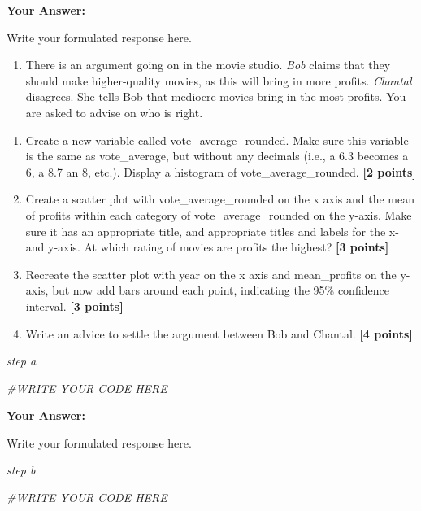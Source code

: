 \documentclass[
]{article}
\newenvironment{Shaded}{\begin{snugshade}}{\end{snugshade}}
\newcommand{\CommentTok}[1]{\textcolor[rgb]{0.56,0.35,0.01}{\textit{#1}}}
\providecommand{\tightlist}{%
  \setlength{\itemsep}{0pt}\setlength{\parskip}{0pt}}
\begin{document}
\textbf{Your Answer:}

Write your formulated response here.

\begin{enumerate}
\def\labelenumi{\arabic{enumi}.}
\setcounter{enumi}{2}
\tightlist
\item
  There is an argument going on in the movie studio. \emph{Bob} claims
  that they should make higher-quality movies, as this will bring in
  more profits. \emph{Chantal} disagrees. She tells Bob that mediocre
  movies bring in the most profits. You are asked to advise on who is
  right.
\end{enumerate}

\begin{enumerate}
\def\labelenumi{\alph{enumi}.}
\tightlist
\item
  Create a new variable called vote\_average\_rounded. Make sure this
  variable is the same as vote\_average, but without any decimals (i.e.,
  a 6.3 becomes a 6, a 8.7 an 8, etc.). Display a histogram of
  vote\_average\_rounded. \textbf{[2 points]}
\item
  Create a scatter plot with vote\_average\_rounded on the x axis and
  the mean of profits within each category of vote\_average\_rounded on
  the y-axis. Make sure it has an appropriate title, and appropriate
  titles and labels for the x- and y-axis. At which rating of movies are
  profits the highest? \textbf{[3 points]}
\item
  Recreate the scatter plot with year on the x axis and mean\_profits on
  the y-axis, but now add bars around each point, indicating the 95\%
  confidence interval. \textbf{[3 points]}
\item
  Write an advice to settle the argument between Bob and Chantal.
  \textbf{[4 points]}
\end{enumerate}

\emph{step a}

\begin{Shaded}
\begin{Highlighting}[]
\CommentTok{\#WRITE YOUR CODE HERE}
\end{Highlighting}
\end{Shaded}

\textbf{Your Answer:}

Write your formulated response here.

\emph{step b}

\begin{Shaded}
\begin{Highlighting}[]
\CommentTok{\#WRITE YOUR CODE HERE}
\end{Highlighting}
\end{Shaded}
\end{document}
